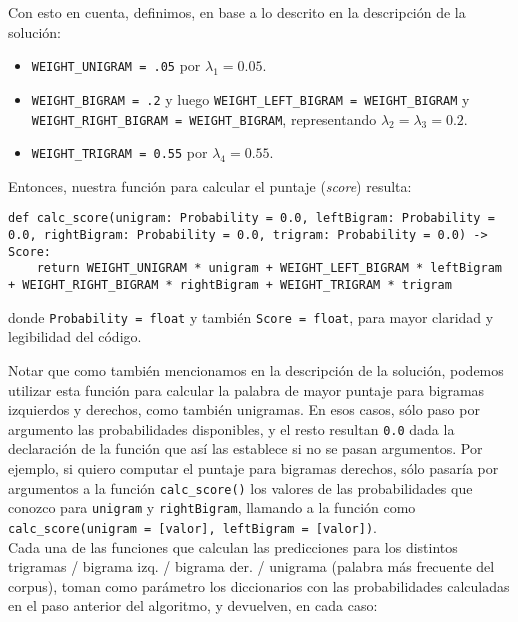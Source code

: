 \documentclass[a4paper]{article}
\begin{document}
Con esto en cuenta, definimos, en base a lo descrito en la descripción de la solución:

\begin{itemize}
    \item \texttt{WEIGHT_UNIGRAM = .05} por $\lambda_1 = 0.05$.
    \item \texttt{WEIGHT_BIGRAM = .2} y luego \texttt{WEIGHT\_LEFT\_BIGRAM = WEIGHT\_BIGRAM} y \texttt{WEIGHT\_RIGHT\_BIGRAM = WEIGHT\_BIGRAM}, representando $\lambda_2 = \lambda_3 = 0.2$.
    \item \texttt{WEIGHT_TRIGRAM = 0.55} por $\lambda_4 = 0.55$.
\end{itemize}

Entonces, nuestra función para calcular el puntaje (\textit{score}) resulta:

\begin{verbatim}
def calc_score(unigram: Probability = 0.0, leftBigram: Probability = 0.0, rightBigram: Probability = 0.0, trigram: Probability = 0.0) -> Score:
    return WEIGHT_UNIGRAM * unigram + WEIGHT_LEFT_BIGRAM * leftBigram + WEIGHT_RIGHT_BIGRAM * rightBigram + WEIGHT_TRIGRAM * trigram
\end{verbatim}

\noindent donde \texttt{Probability = float} y también \texttt{Score = float}, para mayor claridad y legibilidad del código.

Notar que como también mencionamos en la descripción de la solución, podemos utilizar esta función para calcular la palabra de mayor puntaje para bigramas izquierdos y derechos, como también unigramas. En esos casos, sólo paso por argumento las probabilidades disponibles, y el resto resultan \texttt{0.0} dada la declaración de la función que así las establece si no se pasan argumentos. Por ejemplo, si quiero computar el puntaje para bigramas derechos, sólo pasaría por argumentos a la función \texttt{calc_score()} los valores de las probabilidades que conozco para \texttt{unigram} y \texttt{rightBigram}, llamando a la función como \texttt{calc_score(unigram = [valor], leftBigram = [valor])}. \\

Cada una de las funciones que calculan las predicciones para los distintos trigramas / bigrama izq. / bigrama der. / unigrama (palabra más frecuente del corpus), toman como parámetro los diccionarios con las probabilidades calculadas en el paso anterior del algoritmo, y devuelven, en cada caso:
\end{document}
